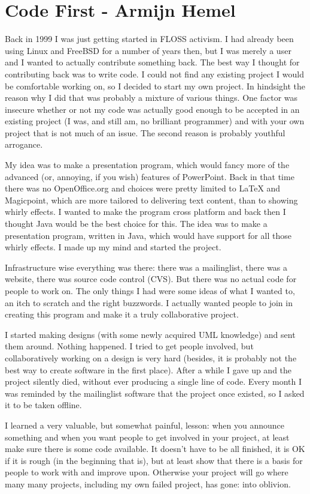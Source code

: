 \chapter{Code First - Armijn Hemel}
Back in 1999 I was just getting started in FLOSS activism. I had already been using Linux and FreeBSD for a number of years then, but I was merely a user and I wanted to actually contribute something back. The best way I thought for contributing back was to write code. I could not find any existing project I would be comfortable working on, so I decided to start my own project. In hindsight the reason why I did that was probably a mixture of various things. One factor was insecure whether or not my code was actually good enough to be accepted in an existing project (I was, and still am, no brilliant programmer) and with your own project that is not much of an issue. The second reason is probably youthful arrogance.

My idea was to make a presentation program, which would fancy more of the advanced (or, annoying, if you wish) features of PowerPoint. Back in that time there was no OpenOffice.org and choices were pretty limited to LaTeX and Magicpoint, which are more tailored to delivering text content, than to showing whirly effects. I wanted to make the program cross platform and back then I thought Java would be the best choice for this. The idea was to make a presentation program, written in Java, which would have support for all those whirly effects. I made up my mind and started the project.

Infrastructure wise everything was there: there was a mailinglist, there was a website, there was source code control (CVS). But there was no actual code for people to work on. The only things I had were some ideas of what I wanted to, an itch to scratch and the right buzzwords. I actually wanted people to join in creating this program and make it a truly collaborative project.

I started making designs (with some newly acquired UML knowledge) and sent them around. Nothing happened. I tried to get people involved, but collaboratively working on a design is very hard (besides, it is probably not the best way to create software in the first place). After a while I gave up and the project silently died, without ever producing a single line of code. Every month I was reminded by the mailinglist software that the project once existed, so I asked it to be taken offline.

I learned a very valuable, but somewhat painful, lesson: when you announce something and when you want people to get involved in your project, at least make sure there is some code available. It doesn't have to be all finished, it is OK if it is rough (in the beginning that is), but at least show that there is a basis for people to work with and improve upon. Otherwise your project will go where many many projects, including my own failed project, has gone: into oblivion.

